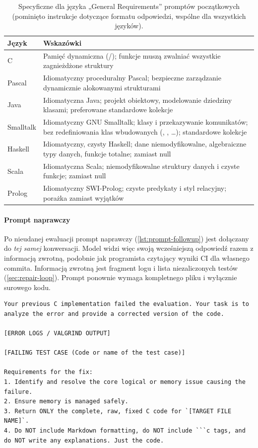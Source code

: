 \begin{table}[htbp]
  \centering
  \caption{Specyficzne dla języka „General Requirements” promptów początkowych (pominięto
    instrukcje dotyczące formatu odpowiedzi, wspólne dla wszystkich języków).}
  \label{tab:guidance}
  \small
  \begin{tabularx}{\textwidth}{@{}lY@{}}
    \toprule
    Język & Wskazówki \\
    \midrule
    C         & Pamięć dynamiczna (/); funkcje  muszą zwalniać wszystkie zagnieżdżone struktury \\
    Pascal    & Idiomatyczny proceduralny Pascal; bezpieczne zarządzanie dynamicznie alokowanymi strukturami \\
    Java      & Idiomatyczna Java; projekt obiektowy, modelowanie dziedziny klasami; preferowane standardowe kolekcje \\
    Smalltalk & Idiomatyczny GNU Smalltalk; klasy i przekazywanie komunikatów; bez redefiniowania klas wbudowanych (, , \ldots); standardowe kolekcje \\
    Haskell   & Idiomatyczny, czysty Haskell; dane niemodyfikowalne, algebraiczne typy danych, funkcje totalne;  zamiast null \\
    Scala     & Idiomatyczna Scala; niemodyfikowalne struktury danych i czyste funkcje;  zamiast null \\
    Prolog    & Idiomatyczny SWI-Prolog; czyste predykaty i styl relacyjny; porażka zamiast wyjątków \\
    \bottomrule
  \end{tabularx}
\end{table}

\paragraph{Prompt naprawczy} Po nieudanej ewaluacji prompt naprawczy (\cref{lst:prompt-followup}) jest
dołączany do \emph{tej samej} konwersacji. Model widzi więc swoją wcześniejszą odpowiedź razem
z informacją zwrotną, podobnie jak programista czytający wyniki CI dla własnego commita. Informacją
zwrotną jest fragment logu i lista niezaliczonych testów (\cref{sec:repair-loop}). Prompt ponownie
wymaga kompletnego pliku i wyłącznie surowego kodu.

\begin{lstlisting}[style=prompt,caption={Szablon promptu naprawczego dla C.},label={lst:prompt-followup}]
Your previous C implementation failed the evaluation. Your task is to analyze the error and provide a corrected version of the code.

[ERROR LOGS / VALGRIND OUTPUT]

[FAILING TEST CASE (Code or name of the test case)]

Requirements for the fix:
1. Identify and resolve the core logical or memory issue causing the failure.
2. Ensure memory is managed safely.
3. Return ONLY the complete, raw, fixed C code for `[TARGET FILE NAME]`.
4. Do NOT include Markdown formatting, do NOT include ```c tags, and do NOT write any explanations. Just the code.
\end{lstlisting}


